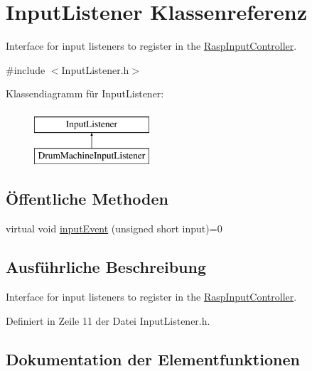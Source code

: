 \hypertarget{class_input_listener}{}\section{Input\+Listener Klassenreferenz}
\label{class_input_listener}


Interface for input listeners to register in the \hyperlink{class_rasp_input_controller}{Rasp\+Input\+Controller}.  




{\ttfamily \#include $<$Input\+Listener.\+h$>$}

Klassendiagramm für Input\+Listener\+:\begin{figure}[H]
\begin{center}
\leavevmode
\includegraphics[height=2.000000cm]{class_input_listener}
\end{center}
\end{figure}
\subsection*{Öffentliche Methoden}
\begin{DoxyCompactItemize}
\item 
virtual void \hyperlink{class_input_listener_a1a3d74f2ffc108c773511ea4be250f7d}{input\+Event} (unsigned short input)=0
\end{DoxyCompactItemize}


\subsection{Ausführliche Beschreibung}
Interface for input listeners to register in the \hyperlink{class_rasp_input_controller}{Rasp\+Input\+Controller}. 

Definiert in Zeile 11 der Datei Input\+Listener.\+h.



\subsection{Dokumentation der Elementfunktionen}
\mbox{\label{class_input_listener_a1a3d74f2ffc108c773511ea4be250f7d}} 
